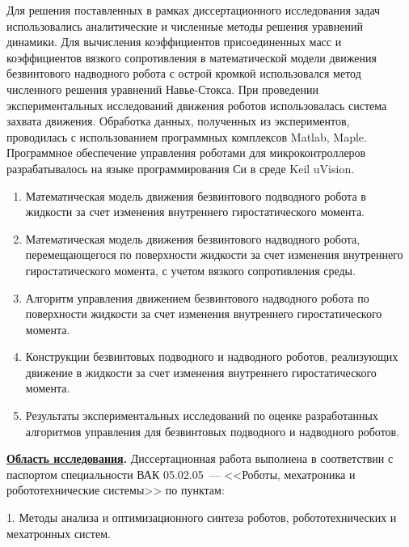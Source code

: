 {\methods} Для решения поставленных в рамках диссертационного исследования задач использовались аналитические и численные методы решения уравнений динамики. Для вычисления коэффициентов присоединенных масс и коэффициентов вязкого сопротивления в математической модели движения безвинтового надводного робота с острой кромкой использовался метод численного решения уравнений Навье-Стокса. При проведении экспериментальных исследований движения роботов использовалась система захвата движения. Обработка данных, полученных из экспериментов, проводилась с использованием программных комплексов Matlab, Maple. Программное обеспечение управления роботами для микроконтроллеров разрабатывалось на языке программирования Си в среде Keil uVision.

{}
\begin{enumerate}
  \item Математическая модель движения безвинтового подводного робота в жидкости за счет изменения внутреннего гиростатического момента.
  \item Математическая модель движения безвинтового надводного робота, перемещающегося по поверхности жидкости за счет изменения внутреннего гиростатического момента, с учетом вязкого сопротивления среды.
  \item Алгоритм управления движением безвинтового надводного робота по поверхности жидкости за счет изменения внутреннего гиростатического момента.
  \item Конструкции безвинтовых подводного и надводного роботов, реализующих движение в жидкости за счет изменения внутреннего гиростатического момента.
  \item Результаты экспериментальных исследований по оценке разработанных алгоритмов управления для безвинтовых подводного и надводного роботов.
  
\end{enumerate}

\textbf{\underline{Область исследования}.} Диссертационная работа выполнена в соответствии с паспортом специальности ВАК 05.02.05~--- <<Роботы, мехатроника и робототехнические системы>> по пунктам: 

1. Методы анализа и оптимизационного синтеза роботов, робототехнических и мехатронных систем. 

